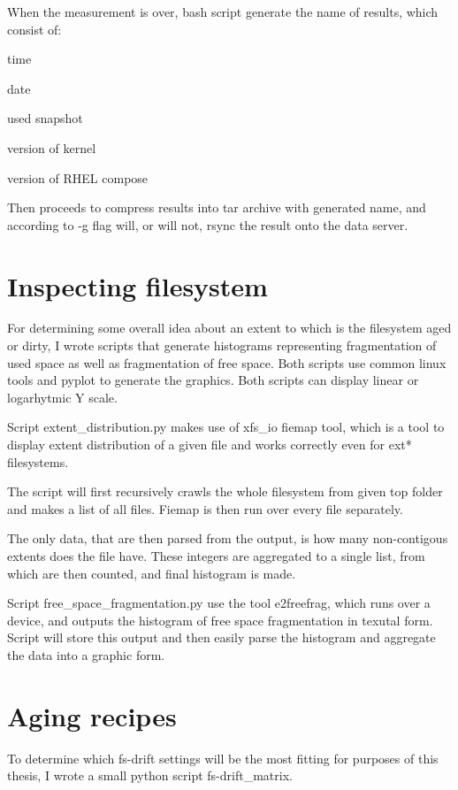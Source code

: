 \documentclass[
  color, %
  table, %
  lof,   %
  lot,   %
]{fithesis3}
\begin{document}
When the measurement is over, bash script generate the name of results, which consist of:
\begin{compactenum}
  \item time
  \item date
  \item used snapshot
  \item version of kernel
  \item version of RHEL compose
\end{compactenum}

Then proceeds to compress results into tar archive with generated name, and according to -g flag will, or will not, rsync the result onto the data server.
\section{Inspecting filesystem}
For determining some overall idea about an extent to which is the filesystem aged or dirty, I wrote scripts that generate histograms representing fragmentation of used space as well as fragmentation of free space. Both scripts use common linux tools and pyplot to generate the graphics. Both scripts can display linear or logarhytmic Y scale.


Script extent\_distribution.py makes use of xfs\_io fiemap tool, which is a tool to display extent distribution of a given file and works correctly even for ext* filesystems.

The script will first recursively crawls the whole filesystem from given top folder and makes a list of all files. Fiemap is then run over every file separately. 

The only data, that are then parsed from the output, is how many non-contigous extents does the file have. These integers are aggregated to a single list, from which are then counted, and final histogram is made.

Script free\_space\_fragmentation.py use the tool e2freefrag, which runs over a device, and outputs the histogram of free space fragmentation in texutal form. Script will store this output and then easily parse the histogram and aggregate the data into a graphic form.

\section{Aging recipes}
To determine which fs-drift settings will be the most fitting for purposes of this thesis, I wrote a small python script fs-drift\_matrix.
\end{document}
